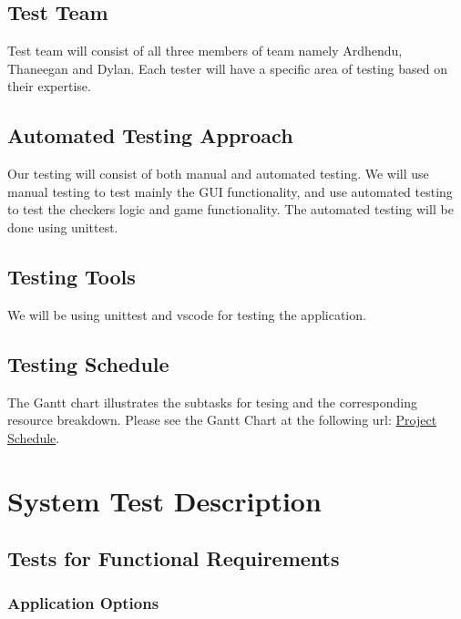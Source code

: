 \documentclass[12pt, titlepage]{article}
\begin{document}
\subsection{Test Team}
Test team will consist of all three members of team namely Ardhendu, Thaneegan and Dylan. Each tester will have a specific area of testing based on their expertise.

\subsection{Automated Testing Approach}
Our testing will consist of both manual and automated testing. We will use manual testing to test mainly the GUI functionality, and use automated testing to test the checkers logic and game functionality. The automated testing will be done using unittest.

\subsection{Testing Tools}
We will be using unittest and vscode for testing the application.

\subsection{Testing Schedule}
The Gantt chart illustrates the subtasks for tesing and the corresponding resource breakdown.
Please see the Gantt Chart at the following url: \href{https://gitlab.cas.mcmaster.ca/bargea/3xa3-g09-2021/-/blob/master/BlankProjectTemplate/ProjectSchedule/3XA3\%20Group\%20Project.pdf}{Project Schedule}.

\section{System Test Description}
	
\subsection{Tests for Functional Requirements}

\subsubsection{Application Options}
		
\end{document}
